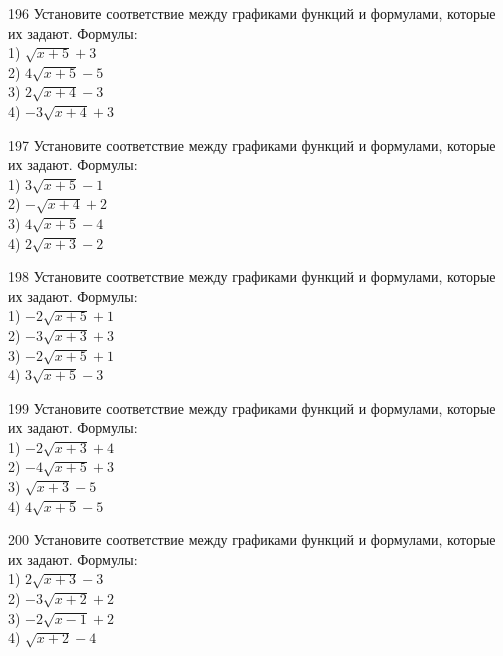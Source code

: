\documentclass[4apaper]{article}
\begin{document}
\begin{taskBN}{196}
Установите соответствие между графиками функций и формулами, которые их задают. Формулы: \\1) $\sqrt{x+5}+3$\\2) $4\sqrt{x+5}-5$\\3) $2\sqrt{x+4}-3$\\4) $-3\sqrt{x+4}+3$
\end{taskBN}

\begin{taskBN}{197}
Установите соответствие между графиками функций и формулами, которые их задают. Формулы: \\1) $3\sqrt{x+5}-1$\\2) $-\sqrt{x+4}+2$\\3) $4\sqrt{x+5}-4$\\4) $2\sqrt{x+3}-2$
\end{taskBN}

\begin{taskBN}{198}
Установите соответствие между графиками функций и формулами, которые их задают. Формулы: \\1) $-2\sqrt{x+5}+1$\\2) $-3\sqrt{x+3}+3$\\3) $-2\sqrt{x+5}+1$\\4) $3\sqrt{x+5}-3$
\end{taskBN}

\begin{taskBN}{199}
Установите соответствие между графиками функций и формулами, которые их задают. Формулы: \\1) $-2\sqrt{x+3}+4$\\2) $-4\sqrt{x+5}+3$\\3) $\sqrt{x+3}-5$\\4) $4\sqrt{x+5}-5$
\end{taskBN}

\begin{taskBN}{200}
Установите соответствие между графиками функций и формулами, которые их задают. Формулы: \\1) $2\sqrt{x+3}-3$\\2) $-3\sqrt{x+2}+2$\\3) $-2\sqrt{x-1}+2$\\4) $\sqrt{x+2}-4$
\end{taskBN}
\end{document}
